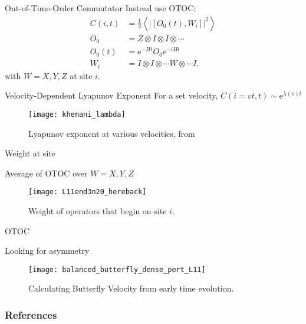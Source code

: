 \documentclass{beamer}
\newcommand{\half}{\frac{1}{2}}
\newcommand{\ex}[1]{\left\langle #1 \right\rangle}
\newcommand{\e}{\text{e}}
\begin{document}
\begin{frame}{Out-of-Time-Order Commutator}
Instead use OTOC:
\begin{align*}
C(i,t) &= \half\ex{|[O_0(t), W_i]|^2}\\
O_0 &= Z\otimes I\otimes I\otimes\cdots\\
O_0(t) &= \e^{-Ht}O_0\e^{-iHt}\\
W_i &= I\otimes I\otimes\cdots W\otimes \cdots I,
\end{align*}
with $W=X,Y,Z$ at site $i$.
\end{frame}

\begin{frame}{Velocity-Dependent Lyapunov Exponent}
For a set velocity, $C(i = vt, t) \sim \e^{\lambda(v)t}$
\begin{figure}
	\centering
	\texttt{[image: khemani\_lambda]}
	\caption{Lyapunov exponent at various velocities, from \cite{Khemani2018}}
\end{figure}
\end{frame}

\begin{frame}{Weight at site}

Average of OTOC over $W = X, Y, Z$
\begin{figure}
	\centering
	\texttt{[image: L11end3n20\_hereback]}
	\caption{Weight of operators that begin on site $i$.}
	\label{fig:L11end3n20back}
\end{figure}

\end{frame}

\begin{frame}{OTOC}

Looking for asymmetry
\begin{figure}
	\centering
	\texttt{[image: balanced\_butterfly\_dense\_pert\_L11]}
	\caption{Calculating Butterfly Velocity from early time evolution.}
\end{figure}

\end{frame}

\begin{frame}
\nocite{}
\frametitle{References}
\footnotesize{
	
	
}
\end{frame}
\end{document}
